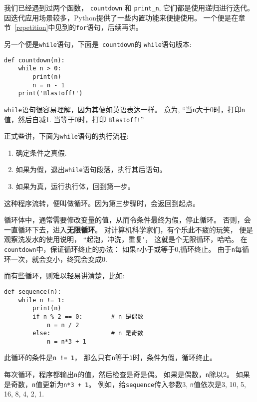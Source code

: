 \documentclass[10pt]{book}
\begin{document}
我们已经遇到过两个函数， {\tt countdown} 和
\verb"print_n",  它们都是使用递归进行迭代。
因迭代应用场景较多，Python提供了一些内置功能来便捷使用。
一个便是在章节~\ref{repetition}中见到的{\tt for}语句，后续再讲。

另一个便是{\tt while}语句，下面是{\tt
countdown}的 {\tt while}语句版本:

\begin{verbatim}
def countdown(n):
    while n > 0:
        print(n)
        n = n - 1
    print('Blastoff!')
\end{verbatim}
%
{\tt while}语句很容易理解，因为其便如英语表达一样。
意为, ``当{\tt n}大于0时，打印{\tt n}值，然后自减1.
当等于0时，打印 {\tt Blastoff!}''

正式些讲，下面为{\tt while}语句的执行流程:

\begin{enumerate}

\item 确定条件之真假.

\item 如果为假，退出{\tt while}语句段落，执行其后语句。

\item 如果为真，运行执行体，回到第一步。

\end{enumerate}

这种程序流转，便叫做循环。因为第三步骤时，会返回到起点。

循环体中，通常需要修改变量的值，从而令条件最终为假，停止循环。
否则，会一直循环下去，进入{\bf 无限循环}。
对计算机科学家们，有个乐此不疲的玩笑，
便是观察洗发水的使用说明，
``起泡，冲洗，重复"， 这就是个无限循环，哈哈。
在{\tt countdown}中，保证循环终止的办法：
如果{\tt n}小于或等于0,循环终止。
由于{\tt n}每循环一次，就会变小，终究会变成0.

而有些循环，则难以轻易讲清楚，比如:

\begin{verbatim}
def sequence(n):
    while n != 1:
        print(n)
        if n % 2 == 0:        # n 是偶数
            n = n / 2
        else:                 # n 是奇数
            n = n*3 + 1
\end{verbatim}
%
此循环的条件是{\tt n != 1}， 那么只有{\tt n}等于{\tt 1}时，条件为假，循环终止。

每次循环，程序都输出{\tt n}的值，然后检查是奇是偶。
如果是偶数，{\tt n}除以2。 如果是奇数，{\tt n}值更新为{\tt n*3 + 1}。
例如，给{\tt sequence}传入参数3, {\tt n}值依次是3, 10, 5, 16, 8, 4, 2, 1.
\end{document}

